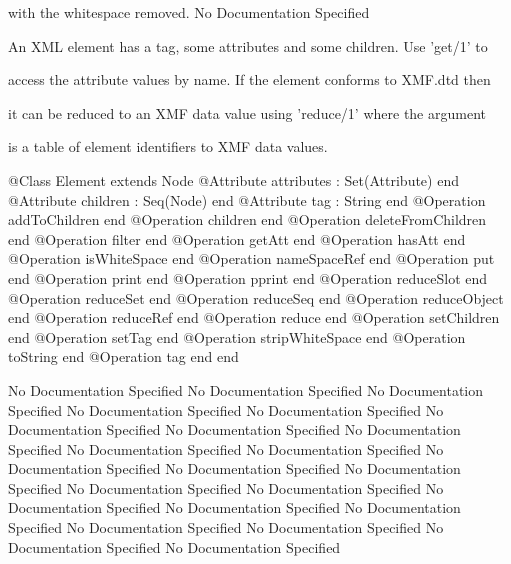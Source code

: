         with the whitespace removed.
No Documentation Specified

      An XML element has a tag, some attributes and some children. Use 'get/1' to

      access the attribute values by name. If the element conforms to XMF.dtd then

      it can be reduced to an XMF data value using 'reduce/1' where the argument

      is a table of element identifiers to XMF data values.
\begin{Interface}
@Class Element extends Node
  @Attribute attributes : Set(Attribute) end
  @Attribute children : Seq(Node) end
  @Attribute tag : String end
  @Operation addToChildren end
  @Operation children end
  @Operation deleteFromChildren end
  @Operation filter end
  @Operation getAtt end
  @Operation hasAtt end
  @Operation isWhiteSpace end
  @Operation nameSpaceRef end
  @Operation put end
  @Operation print end
  @Operation pprint end
  @Operation reduceSlot end
  @Operation reduceSet end
  @Operation reduceSeq end
  @Operation reduceObject end
  @Operation reduceRef end
  @Operation reduce end
  @Operation setChildren end
  @Operation setTag end
  @Operation stripWhiteSpace end
  @Operation toString end
  @Operation tag end
end
\end{Interface}
No Documentation Specified
No Documentation Specified
No Documentation Specified
No Documentation Specified
No Documentation Specified
No Documentation Specified
No Documentation Specified
No Documentation Specified
No Documentation Specified
No Documentation Specified
No Documentation Specified
No Documentation Specified
No Documentation Specified
No Documentation Specified
No Documentation Specified
No Documentation Specified
No Documentation Specified
No Documentation Specified
No Documentation Specified
No Documentation Specified
No Documentation Specified
No Documentation Specified

